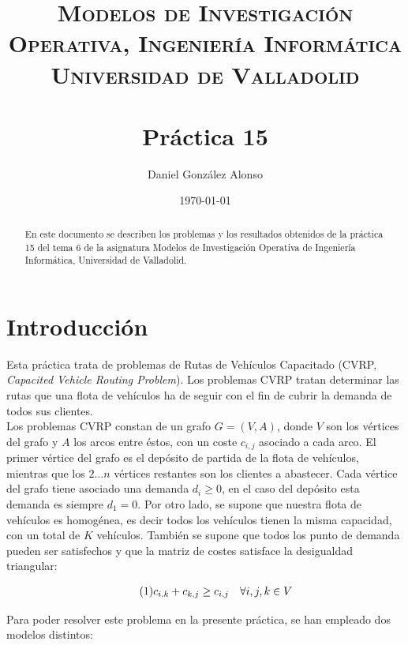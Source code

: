 \documentclass[a4paper,11pt]{article}
\title{
	\vspace{-25pt}
	\normalfont \Large \textsc{
		Modelos de Investigación Operativa,
        Ingeniería Informática\\
        Universidad de Valladolid
	}\\[10pt]
	\horrule{1pt}\\[10pt]
	\huge \textbf{
		Práctica 15
	}\\
	\horrule{1pt}
}
\author{
	\normalfont \Large Daniel González Alonso
}
\date{
	\normalfont \large \today
}
\newcommand\numberthis{							%
	\addtocounter{equation}{1}\tag{\theequation}
}
\begin{document}
\maketitle

\begin{abstract}
	En este documento se describen los problemas y los resultados obtenidos de la práctica 15 del tema 6 de la asignatura Modelos de Investigación Operativa de Ingeniería Informática, Universidad de Valladolid.
\end{abstract}

\section{Introducción}
Esta práctica trata de problemas de Rutas de Vehículos Capacitado (CVRP, \textit{Capacited Vehicle Routing Problem}). Los problemas CVRP tratan determinar las rutas que una flota de vehículos ha de seguir con el fin de cubrir la demanda de todos sus clientes.\\

Los problemas CVRP constan de un grafo ${G=(V,A)}$, donde ${V}$ son los vértices del grafo y ${A}$ los arcos entre éstos, con un coste ${c_{i,j}}$ asociado a cada arco. El primer vértice del grafo es el depósito de partida de la flota de vehículos, mientras que los ${2 \ldots n}$ vértices restantes son los clientes a abastecer. Cada vértice del grafo tiene asociado una demanda ${d_{i} \geq 0}$, en el caso del depósito esta demanda es siempre ${d_{1}=0}$. Por otro lado, se supone que nuestra flota de vehículos es homogénea, es decir todos los vehículos tienen la misma capacidad, con un total de ${K}$ vehículos. También se supone que todos los punto de demanda pueden ser satisfechos y que la matriz de costes satisface la desigualdad triangular:

\begin{align*}\numberthis
	\label{desigualdad_triangular}
	c_{i,k} + c_{k,j} \geq c_{i,j}	&& \forall i,j,k \in V \\
\end{align*}

Para poder resolver este problema en la presente práctica, se han empleado dos modelos distintos:
\end{document}
